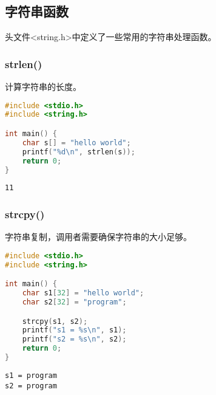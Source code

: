 \vspace{0.5cm}

\subsection{字符串函数}

头文件<string.h>中定义了一些常用的字符串处理函数。

\subsubsection{strlen()}

计算字符串的长度。\\


\begin{lstlisting}[language=C]
#include <stdio.h>
#include <string.h>

int main() {
	char s[] = "hello world";
	printf("%d\n", strlen(s));
	return 0;
}
\end{lstlisting}

\begin{tcolorbox}
	\begin{verbatim}
11
	\end{verbatim}
\end{tcolorbox}

\vspace{0.5cm}

\subsubsection{strcpy()}

字符串复制，调用者需要确保字符串的大小足够。\\


\begin{lstlisting}[language=C]
#include <stdio.h>
#include <string.h>

int main() {
	char s1[32] = "hello world";
	char s2[32] = "program";

	strcpy(s1, s2);
	printf("s1 = %s\n", s1);
	printf("s2 = %s\n", s2);
	return 0;
}
\end{lstlisting}

\begin{tcolorbox}
	\begin{verbatim}
s1 = program
s2 = program
	\end{verbatim}
\end{tcolorbox}

